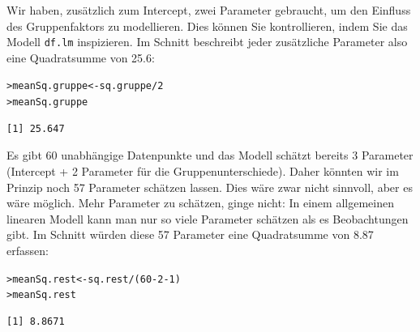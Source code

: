 \documentclass[oneside, 10pt]{book}\usepackage[]{graphicx}\usepackage[]{xcolor}
\makeatletter
\newcommand{\hlnum}[1]{\textcolor[rgb]{0.686,0.059,0.569}{#1}}%
\newcommand{\hlopt}[1]{\textcolor[rgb]{0,0,0}{#1}}%
\newcommand{\hlstd}[1]{\textcolor[rgb]{0.345,0.345,0.345}{#1}}%
\newcommand{\hlkwb}[1]{\textcolor[rgb]{0.69,0.353,0.396}{#1}}%
\newenvironment{kframe}{%
 \def\at@end@of@kframe{}%
 \ifinner\ifhmode%
  \def\at@end@of@kframe{\end{minipage}}%
  \begin{minipage}{\columnwidth}%
 \fi\fi%
 \def\FrameCommand##1{\hskip\@totalleftmargin \hskip-\fboxsep
 \colorbox{shadecolor}{##1}\hskip-\fboxsep
     \hskip-\linewidth \hskip-\@totalleftmargin \hskip\columnwidth}%
 \MakeFramed {\advance\hsize-\width
   \@totalleftmargin\z@ \linewidth\hsize
   \@setminipage}}%
 {\par\unskip\endMakeFramed%
 \at@end@of@kframe}
\newenvironment{knitrout}{}{} %
\makeatother
\begin{document}
Wir haben, zusätzlich zum Intercept, zwei Parameter gebraucht,
um den Einfluss des Gruppenfaktors zu modellieren. Dies können
Sie kontrollieren, indem Sie das Modell \texttt{df.lm} inspizieren.
Im Schnitt beschreibt jeder zusätzliche Parameter also eine Quadratsumme von 25.6:
\begin{knitrout}
\color{fgcolor}\begin{kframe}
\begin{alltt}
\hlstd{> }\hlstd{meanSq.gruppe} \hlkwb{<-} \hlstd{sq.gruppe} \hlopt{/} \hlnum{2}
\hlstd{> }\hlstd{meanSq.gruppe}
\end{alltt}
\begin{verbatim}
[1] 25.647
\end{verbatim}
\end{kframe}
\end{knitrout}

Es gibt 60 unabhängige Datenpunkte und das Modell schätzt
bereits 3 Parameter (Intercept + 2 Parameter für die
Gruppenunterschiede). Daher könnten wir im Prinzip
noch 57 Parameter schätzen lassen. Dies wäre zwar nicht
sinnvoll, aber es wäre möglich. Mehr Parameter zu schätzen,
ginge nicht: In einem allgemeinen linearen Modell kann man
nur so viele Parameter schätzen als es Beobachtungen gibt.
Im Schnitt würden diese 57 Parameter eine Quadratsumme
von 8.87 erfassen:
\begin{knitrout}
\color{fgcolor}\begin{kframe}
\begin{alltt}
\hlstd{> }\hlstd{meanSq.rest} \hlkwb{<-} \hlstd{sq.rest} \hlopt{/} \hlstd{(}\hlnum{60} \hlopt{-} \hlnum{2} \hlopt{-} \hlnum{1}\hlstd{)}
\hlstd{> }\hlstd{meanSq.rest}
\end{alltt}
\begin{verbatim}
[1] 8.8671
\end{verbatim}
\end{kframe}
\end{knitrout}
\end{document}
